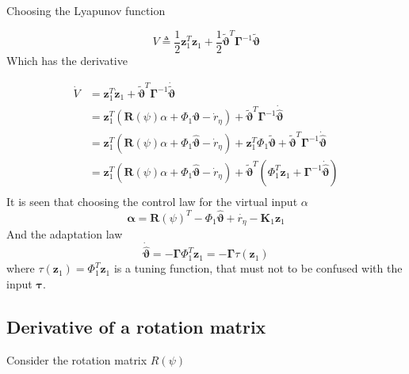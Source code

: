 \documentclass[12pt,a4]{article}
\begin{document}
Choosing the Lyapunov function

\begin{equation}
	V \triangleq \frac{1}{2}\bm{z}_1^T\bm{z}_1 + \frac{1}{2}\bm{\tilde{\vartheta}}^T\bm{\Gamma}^{-1}\bm{\tilde{\vartheta}}
\end{equation}
Which has the derivative

\begin{align}
	\dot{V} & = \bm{z}_1^T\dot{\bm{z}}_1
	+ \bm{\tilde{\vartheta}} ^T\bm{\Gamma}^{-1}\bm{\dot{\tilde{\vartheta}}}                                        \\
	        & = \bm{z}_1^T\left( \bm{R}(\psi)\alpha + \Phi_1\bm{\vartheta} - \dot{r}_{\eta} \right)
	+ \bm{\tilde{\vartheta}} ^T\bm{\Gamma}^{-1}\bm{\dot{\hat{\vartheta}}}                                          \\
	        & = \bm{z}_1^T\left( \bm{R}(\psi)\alpha + \Phi_1\bm{\hat{\vartheta}} - \dot{r}_{\eta} \right)
	+ \bm{z}_1^T\Phi_1\bm{\tilde{\vartheta}} + \bm{\tilde{\vartheta}} ^T\bm{\Gamma}^{-1}\bm{\dot{\hat{\vartheta}}} \\
	        & = \bm{z}_1^T\left( \bm{R}(\psi)\alpha + \Phi_1\bm{\hat{\vartheta}} - \dot{r}_{\eta} \right)
	+ \bm{\tilde{\vartheta}}^T \left(  \Phi_1^T\bm{z}_1 + \bm{\Gamma}^{-1}\bm{\dot{\hat{\vartheta}}} \right)       \\
\end{align}
It is seen that choosing the control law for the virtual input $\alpha$
\begin{equation}
	\bm{\alpha} = \bm{R}(\psi)^T  -\Phi_1 \bm{\hat{\vartheta}}    +\dot{r_{\eta}} -\bm{K}_1\bm{z}_1
\end{equation}
And the adaptation law
\begin{equation}
	\bm{\dot{\hat{\vartheta}}} = - \bm{\Gamma} \Phi_1^T \bm{z}_1 = - \bm{\Gamma} \tau(\bm{z}_1)
\end{equation}
where $\tau(\bm{z}_1) = \Phi_1^T \bm{z}_1$ is a tuning function, that must not to be confused with the input $\bm{\tau}$.



\subsection{Derivative of a rotation matrix}
Consider the rotation matrix $R(\psi)$
\end{document}
